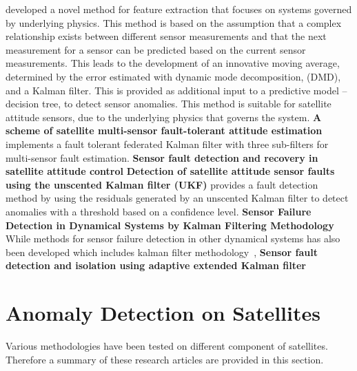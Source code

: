 \cite{DeSilva2020} developed a novel method for feature extraction that focuses on systems governed by underlying physics. This method is based on the assumption that a complex relationship exists between different sensor measurements and that the next measurement for a sensor can be predicted based on the current sensor measurements. This leads to the development of an innovative moving average, determined by the error estimated with dynamic mode decomposition, (DMD), and a Kalman filter. This is provided as additional input to a predictive model -- decision tree, to detect sensor anomalies. This method is suitable for satellite attitude sensors, due to the underlying physics that governs the system.
\textbf{A scheme of satellite multi-sensor fault-tolerant attitude estimation}
\cite{Zhou2016} implements a fault tolerant federated Kalman filter with three sub-filters for multi-sensor fault estimation. 
\textbf{Sensor fault detection and recovery in satellite attitude control}
\cite{Nasrolahi2018} 
\textbf{Detection of satellite attitude sensor faults using the unscented Kalman filter (UKF)}
\cite{Xiong2007} provides a fault detection method by using the residuals generated by an unscented Kalman filter to detect anomalies with a threshold based on a confidence level. 
\textbf{Sensor Failure Detection in Dynamical Systems by Kalman Filtering Methodology}
While methods for sensor failure detection in other dynamical systems has also been developed which includes kalman filter methodology~\cite{Ciftciogl1991},
\textbf{Sensor fault detection and isolation using adaptive extended Kalman filter}
\cite{van2012sensor}

\section{Anomaly Detection on Satellites}
Various methodologies have been tested on different component of satellites. Therefore a summary of these research articles are provided in this section.

